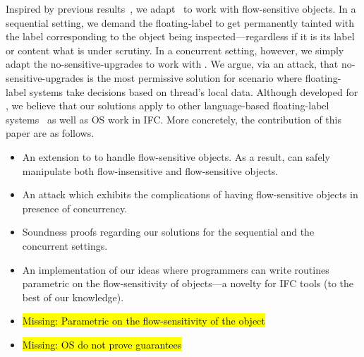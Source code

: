 Inspired by previous results~\citep{Austin:Flanagan:PLAS10}, we adapt \LIO~to
work with flow-sensitive objects. In a sequential setting, we demand the
floating-label to get permanently tainted with the label corresponding to the
object being inspected---regardless if it is its label or content what is under
scrutiny. In a concurrent setting, however, we simply adapt the
no-sensitive-upgrades to work with \LIO. We argue, via an attack, that
no-sensitive-upgrades is the most permissive solution for scenario where
floating-label systems take decisions based on thread's local data. Although
developed for \LIO, we believe that our solutions apply to other language-based
floating-label systems~\citep[e.g.][]{10.1109/SP.2013.10} as well as OS work in
IFC. More concretely, the contribution of this paper are as follows.
\begin{itemize}

\item An extension to \LIO to handle flow-sensitive objects. As a result, \LIO
  can safely manipulate both flow-insensitive and flow-sensitive objects. 

\item An attack which exhibits the complications of having flow-sensitive
  objects in presence of concurrency.

\item Soundness proofs regarding our solutions for the sequential and 
the concurrent settings. 

\item An implementation of our ideas where programmers can write routines 
  parametric on the flow-sensitivity of objects---a novelty for IFC tools 
  (to the best of our knowledge).

\end{itemize}

\begin{itemize}
\item \hl{Missing: Parametric on the flow-sensitivity of the object}
\item \hl{Missing: OS do not prove guarantees}
\end{itemize}
